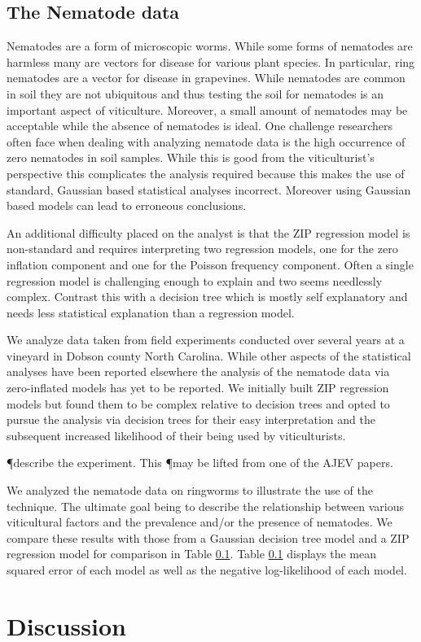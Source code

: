 \documentclass{article}
\begin{document}
\subsection{The Nematode data}

Nematodes are a form of microscopic worms. While some forms of nematodes are harmless many are vectors for disease for various plant species. In particular, ring nematodes  are a vector for disease in grapevines. While nematodes are common in soil they are not ubiquitous and thus testing the soil for nematodes is an important aspect of viticulture. Moreover, a small amount of nematodes may be acceptable while the absence of nematodes is ideal. One challenge researchers often face when dealing with analyzing nematode data is the high occurrence of zero nematodes in soil samples. While this is good from the viticulturist's perspective this complicates the analysis required because this makes the use of standard, Gaussian based statistical analyses incorrect. Moreover using Gaussian based models can lead to erroneous conclusions. 

An additional difficulty placed on the analyst is that the ZIP regression model is non-standard and requires interpreting two regression models, one for the zero inflation component and one for the Poisson frequency component. Often a single regression model is challenging enough to explain and two seems needlessly complex. Contrast this with a decision tree which is mostly self explanatory and needs less statistical explanation than a regression model. 

We analyze data taken from field experiments conducted over several years at a vineyard in Dobson county North Carolina. While other aspects of the statistical analyses have been reported elsewhere \cite{} the analysis of the nematode data via zero-inflated models has yet to be reported. We initially built ZIP regression models but found them to be complex relative to decision trees and opted to pursue the analysis via decision trees for their easy interpretation and the subsequent increased likelihood of their being used by viticulturists. 

\P describe the experiment. This \P may be lifted from one of the AJEV papers. 

We analyzed the nematode data on ringworms to illustrate the use of the technique. The ultimate goal being to describe the relationship between various viticultural factors and the prevalence and/or the presence of nematodes. We compare these results with those from a Gaussian decision tree model and a ZIP regression model for comparison in Table \ref{}. 
Table \ref{} displays the mean squared error of each model as well as the negative log-likelihood of each model. 

\section{Discussion}\label{sec:discussion}



 
\end{document}
